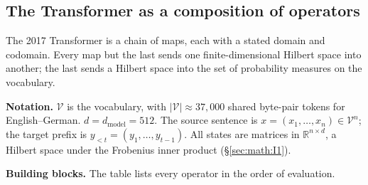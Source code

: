\subsection{The Transformer as a composition of
operators}\label{sec:math:IV1}

The 2017 Transformer is a chain of maps, each with a stated domain and
codomain. Every map but the last sends one finite-dimensional Hilbert
space into another; the last sends a Hilbert space into the set of
probability measures on the vocabulary.

\textbf{Notation.} \(\mathcal{V}\) is the vocabulary, with
\(|\mathcal{V}| \approx 37{,}000\) shared byte-pair tokens for
English--German. \(d = d_{\text{model}} = 512\). The source sentence is \(x =
(x_{1}, \ldots, x_n) \in \mathcal{V}^{n}\); the target prefix is
\(y_{<t} = (y_{1}, \ldots, y_{t-1})\). All states are matrices
in \(\mathbb{R}^{n\times d}\), a Hilbert space under the Frobenius inner
product (\S\ref{sec:math:I1}).

\textbf{Building blocks.} The table lists every operator in the order of
evaluation.

